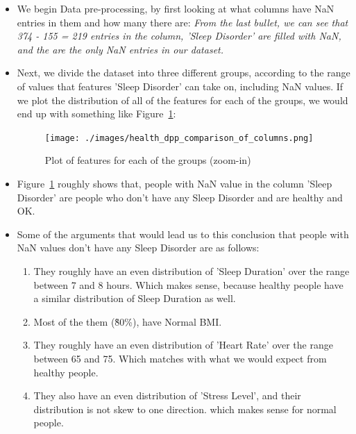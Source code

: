 \documentclass{article}
\begin{document}
\begin{enumerate}
\begin{itemize}
\begin{itemize}
            \item We begin Data pre-processing, by first looking at what columns have NaN entries in them and how many there are:
            \textit{From the last bullet, we can see that 374 - 155 = 219 entries in the column, 'Sleep Disorder' are filled with NaN, and the are the only NaN entries in our dataset.} 
            \item Next, we divide the dataset into three different groups, according to the range of values that features 'Sleep Disorder' can take on, including NaN values. If we plot the distribution of all of the features for each of the groups, 
            we would end up with something like Figure~\ref{fig:Figure_2}:
             
            \begin{figure}[H]  %

                \centering
                \texttt{[image: ./images/health\_dpp\_comparison\_of\_columns.png]}  %
                \caption{Plot of features for each of the groups (zoom-in)}
                \label{fig:Figure_2}  %
    
            \end{figure}
            \item Figure~\ref{fig:Figure_2} roughly shows that, people with NaN value in the column 'Sleep Disorder' are people who don't have any Sleep Disorder and are healthy and OK.
            \item Some of the arguments that would lead us to this conclusion that people with NaN values don't have any Sleep Disorder are as follows:
            \begin{enumerate}
                \item They roughly have an even distribution of 'Sleep Duration' over the range between 7 and 8 hours. Which makes sense, because healthy people have a similar distribution of Sleep Duration as well.
                \item Most of the them (\~80\%), have Normal BMI.
                \item They roughly have an even distribution of 'Heart Rate' over the range between 65 and 75. Which matches with what we would expect from healthy people.
                \item They also have an even distribution of 'Stress Level', and their distribution is not skew to one direction. which makes sense for normal people.
            \end{enumerate} 
        

\end{itemize}
\end{itemize}
\end{enumerate}
\end{document}
